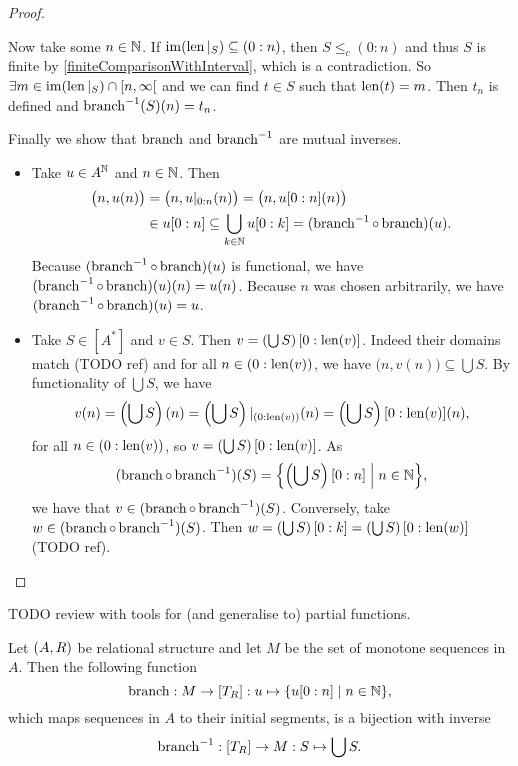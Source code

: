 \begin{proof}
\begin{itemize}
Now take some $n\in \mathbb{N}$. If $\operatorname{im}(\operatorname{len}|_S) \subseteq (0:n)$, then $S \leq_c (0:n)$ and thus $S$ is finite by \ref{finiteComparisonWithInterval}, which is a contradiction. So $\exists m\in \im(\len|_S) \cap \interval[co]{n, \infty}$ and we can find $t \in S$ such that $\operatorname{len}(t) = m$. Then $t_n$ is defined and $\operatorname{branch}^{-1}(S)(n) = t_n$.
\end{itemize}
Finally we show that $\operatorname{branch}$ and $\operatorname{branch}^{-1}$ are mutual inverses.
\begin{itemize}
\item Take $u\in A^{\mathbb{N}}$ and $n\in \mathbb{N}$. Then
\begin{align*}
\big(n, u(n)\big) &= \big(n, u|_{0:n}(n)\big) = \big(n, u[0:n](n)\big) \\
&\in u[0:n] \subseteq \bigcup_{k\in \mathbb{N}}u[0:k] = (\operatorname{branch}^{-1}\circ\operatorname{branch})(u).
\end{align*}
Because $(\operatorname{branch}^{-1}\circ\operatorname{branch})(u)$ is functional, we have $(\operatorname{branch}^{-1}\circ\operatorname{branch})(u)(n) = u(n)$. 
Because $n$ was chosen arbitrarily, we have $(\operatorname{branch}^{-1}\circ\operatorname{branch})(u) = u$.
\item Take $S\in [A^*]$ and $v\in S$. Then $v = \left(\bigcup S\right)[0:\operatorname{len}(v)]$. Indeed their domains match (TODO ref) and for all $n\in (0:\operatorname{len}(v))$, we have $\big(n, v(n)\big) \subseteq \bigcup S$. By functionality of $\bigcup S$, we have
\[ v(n) = \left(\bigcup S\right)(n) = \left(\bigcup S\right)|_{(0:\operatorname{len}(v))}(n) = \left(\bigcup S\right)[0:\operatorname{len}(v)](n), \]
for all $n\in (0:\operatorname{len}(v))$, so $v = \left(\bigcup S\right)[0:\operatorname{len}(v)]$. As
\[ (\branch\circ\branch^{-1})(S) = \setbuilder{\left(\bigcup S\right)[0:n]}{n\in \N}, \]
we have that $v\in (\operatorname{branch}\circ\operatorname{branch}^{-1})(S)$. Conversely, take $w\in (\operatorname{branch}\circ\operatorname{branch}^{-1})(S)$. Then $w = \left(\bigcup S\right)[0:k] = \left(\bigcup S\right)[0:\operatorname{len}(w)]$ (TODO ref). 
\end{itemize}
\end{proof}
TODO review with tools for (and generalise to) partial functions.

\begin{corollary} \label{monotoneSequenceBranch}
Let $\sSet{A, R}$ be relational structure and let $M$ be the set of monotone sequences in $A$. Then the following function
\[ \branch: M \to [T_R]: u \mapsto \setbuilder{u[0:n]}{n\in \N}, \]
which maps sequences in $A$ to their initial segments, is a bijection with inverse
\[ \operatorname{branch}^{-1}: [T_R] \to M: S\mapsto \bigcup S. \]
\end{corollary}

